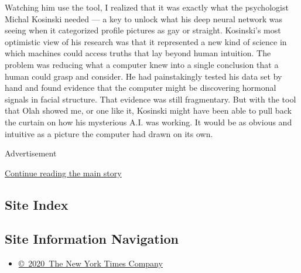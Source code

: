 Watching him use the tool, I realized that it was exactly what the
psychologist Michal Kosinski needed --- a key to unlock what his deep
neural network was seeing when it categorized profile pictures as gay or
straight. Kosinski's most optimistic view of his research was that it
represented a new kind of science in which machines could access truths
that lay beyond human intuition. The problem was reducing what a
computer knew into a single conclusion that a human could grasp and
consider. He had painstakingly tested his data set by hand and found
evidence that the computer might be discovering hormonal signals in
facial structure. That evidence was still fragmentary. But with the tool
that Olah showed me, or one like it, Kosinski might have been able to
pull back the curtain on how his mysterious A.I. was working. It would
be as obvious and intuitive as a picture the computer had drawn on its
own.

Advertisement

\protect\hyperlink{after-bottom}{Continue reading the main story}

\hypertarget{site-index}{%
\subsection{Site Index}\label{site-index}}

\hypertarget{site-information-navigation}{%
\subsection{Site Information
Navigation}\label{site-information-navigation}}

\begin{itemize}
\tightlist
\item
  \href{https://help.nytimes3xbfgragh.onion/hc/en-us/articles/115014792127-Copyright-notice}{©~2020~The
  New York Times Company}
\end{itemize}

